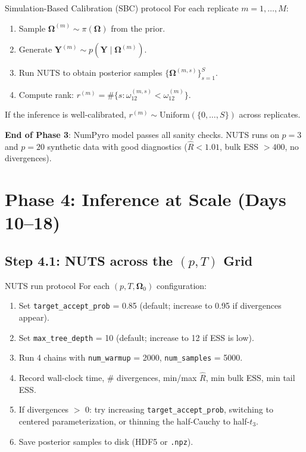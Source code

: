 \documentclass[11pt,a4paper]{article}
\newcommand{\bOmega}{\bm{\Omega}}
\begin{document}
\begin{mathbox}{Simulation-Based Calibration (SBC) protocol}
For each replicate $m=1,\ldots,M$:
\begin{enumerate}[nosep]
  \item Sample $\bOmega^{(m)} \sim \pi(\bOmega)$ from the prior.
  \item Generate $\bm{Y}^{(m)} \sim p(\bm{Y} \mid \bOmega^{(m)})$.
  \item Run NUTS to obtain posterior samples $\{\bOmega^{(m,s)}\}_{s=1}^S$.
  \item Compute rank: $r^{(m)} = \#\{s : \omega_{12}^{(m,s)} < \omega_{12}^{(m)}\}$.
\end{enumerate}
If the inference is well-calibrated, $r^{(m)} \sim \text{Uniform}(\{0,\ldots,S\})$ across replicates.
\end{mathbox}

\begin{milestone}
\textbf{End of Phase 3}: NumPyro model passes all sanity checks. NUTS runs on $p=3$ and $p=20$ synthetic data with good diagnostics ($\hat{R} < 1.01$, bulk ESS $> 400$, no divergences).
\end{milestone}


\section{Phase 4: Inference at Scale (Days 10--18)}\label{sec:phase4}

\subsection{Step 4.1: NUTS across the $(p, T)$ Grid}

\begin{action}{NUTS run protocol}
For each $(p, T, \bOmega_0)$ configuration:
\begin{enumerate}
  \item Set \texttt{target\_accept\_prob} = 0.85 (default; increase to 0.95 if divergences appear).
  \item Set \texttt{max\_tree\_depth} = 10 (default; increase to 12 if ESS is low).
  \item Run 4 chains with \texttt{num\_warmup} = 2000, \texttt{num\_samples} = 5000.
  \item Record wall-clock time, \# divergences, min/max $\hat{R}$, min bulk ESS, min tail ESS.
  \item If divergences $>$ 0: try increasing \texttt{target\_accept\_prob}, switching to centered parameterization, or thinning the half-Cauchy to half-$t_3$.
  \item Save posterior samples to disk (HDF5 or \texttt{.npz}).
\end{enumerate}
\end{action}
\end{document}
